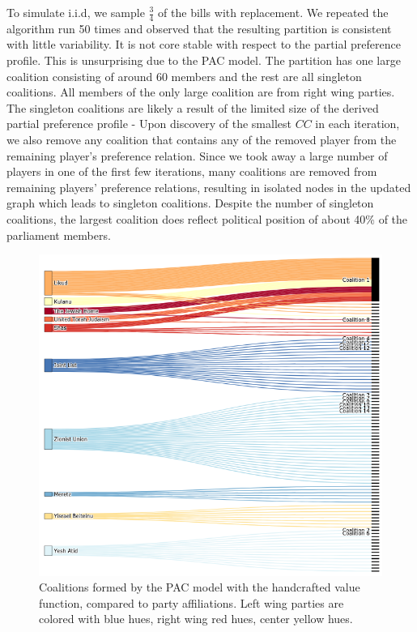 \documentclass[letterpaper]{article} %
\theoremstyle{definition}
\begin{document}
To simulate i.i.d, we sample $\frac{3}{4}$ of the bills with replacement. We repeated the algorithm run 50 times and observed that the resulting partition is consistent with little variability. It is not core stable with respect to the partial preference profile. This is unsurprising due to the PAC model. The partition has one large coalition consisting of around 60 members and the rest are all singleton coalitions. All members of the only large coalition are from right wing parties. The singleton coalitions are likely a result of the limited size of the derived partial preference profile - Upon discovery of the smallest $CC$ in each iteration, we also remove any coalition that contains any of the removed player from the remaining player's preference relation. Since we took away a large number of players in one of the first few iterations, many coalitions are removed from remaining players' preference relations, resulting in isolated nodes in the updated graph which leads to singleton coalitions. Despite the number of singleton coalitions, the largest coalition does reflect political position of about 40\% of the parliament members.

\begin{figure}[htb]
\includegraphics[width=\columnwidth]{pac_value_function}
\caption{Coalitions formed by the PAC model with the handcrafted value function, compared to party affiliations. Left wing parties are colored with blue hues, right wing red hues, center yellow hues.}
\end{figure}
\end{document}
